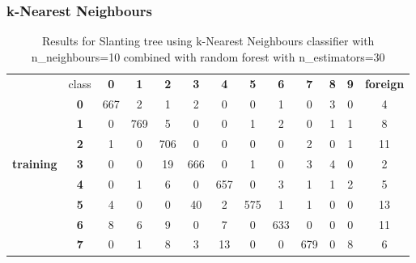 \subsubsection{k-Nearest Neighbours}



\begin{table}[htp]
	\centering
	\caption{Results for Slanting tree using k-Nearest Neighbours classifier with n\_neighbours=10 combined with random forest with n\_estimators=30}
	\label{slanting_tree2_knn_results}
	\begin{tabular}{|c|c|c|c|c|c|c|c|c|c|c|c|c|}
		\hline
		\multirow{11}{*}{\textbf{training}} & class      & \textbf{0} & \textbf{1} & \textbf{2} & \textbf{3} & \textbf{4} & \textbf{5} & \textbf{6} & \textbf{7} & \textbf{8} & \textbf{9} & \textbf{foreign} \\ \cline{2-13} 
		& \textbf{0} & 667        & 2          & 1          & 2          & 0          & 0          & 1          & 0          & 3          & 0          & 4                \\ \cline{2-13} 
		& \textbf{1} & 0          & 769        & 5          & 0          & 0          & 1          & 2          & 0          & 1          & 1          & 8                \\ \cline{2-13} 
		& \textbf{2} & 1          & 0          & 706        & 0          & 0          & 0          & 0          & 2          & 0          & 1          & 11               \\ \cline{2-13} 
		& \textbf{3} & 0          & 0          & 19         & 666        & 0          & 1          & 0          & 3          & 4          & 0          & 2                \\ \cline{2-13} 
		& \textbf{4} & 0          & 1          & 6          & 0          & 657        & 0          & 3          & 1          & 1          & 2          & 5                \\ \cline{2-13} 
		& \textbf{5} & 4          & 0          & 0          & 40         & 2          & 575        & 1          & 1          & 0          & 0          & 13               \\ \cline{2-13} 
		& \textbf{6} & 8          & 6          & 9          & 0          & 7          & 0          & 633        & 0          & 0          & 0          & 11               \\ \cline{2-13} 
		& \textbf{7} & 0          & 1          & 8          & 3          & 13         & 0          & 0          & 679        & 0          & 8          & 6                \\ \cline{2-13} 

\end{tabular}
\end{table}

